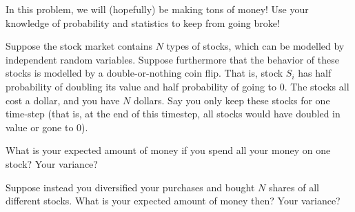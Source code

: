 \documentclass[12pt,twoside]{article}
\begin{document}


\begin{problem}{15}

In this problem, we will (hopefully) be making tons of money!  Use your knowledge of probability and statistics to keep from going broke!

		Suppose the stock market contains $N$ types of stocks, which can be modelled by independent random variables.  Suppose furthermore that the behavior of these stocks is modelled by a 
		double-or-nothing coin flip.  That is, stock $S_i$ has half probability of doubling its value and half probability of going to $0$.  The stocks all cost a dollar, and you have
		$N$ dollars.  Say you only keep these stocks for one time-step (that is, at the end of this timestep, all stocks would have doubled in value or gone to $0$). 

\bparts
		What is your expected amount of money if you spend all your money on one stock?  Your variance?
		
		Suppose instead you diversified your purchases and bought $N$ shares of all different stocks. What is your expected amount of money then?  Your variance?
		
\end{problem}
\end{document}

